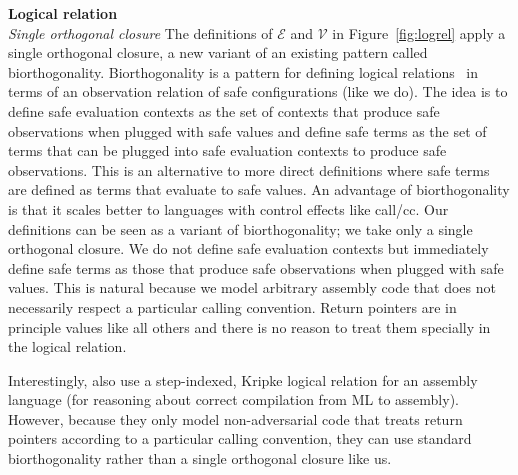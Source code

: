 \documentclass[format=acmsmall, review=true, screen=true]{acmart}
\renewcommand{\figurename}{Figure}
\newcommand{\asmType}{\plaindom{AsmType}}
\newcommand{\plaindom}[1]{\mathrm{#1}}
\newcommand{\intr}[2]{\mathcal{#1}}
\newcommand{\valueintr}[1]{\intr{V}{#1}}
\newcommand{\exprintr}[1]{\intr{E}{#1}}
\newcommand{\stdvr}{\valueintr{\asmType}}
\newcommand{\stder}{\exprintr{\asmType}}
\begin{document}
\noindent\textbf{Logical relation}\\
\emph{Single orthogonal closure} The definitions of $\stder$ and $\stdvr$ in \figurename~\ref{fig:logrel} apply a single orthogonal closure, a new variant of an existing pattern called biorthogonality.
Biorthogonality is a pattern for defining logical relations~\citep{krivine_classical_1994,pitts_operational_1998} in terms of an observation relation of safe configurations (like we do).
The idea is to define safe evaluation contexts as the set of contexts that produce safe observations when plugged with safe values and define safe terms as the set of terms that can be plugged into safe evaluation contexts to produce safe observations.
This is an alternative to more direct definitions where safe terms are defined as terms that evaluate to safe values.
An advantage of biorthogonality is that it scales better to languages with control effects like call/cc.
Our definitions can be seen as a variant of biorthogonality; we take only a single orthogonal closure.
We do not define safe evaluation contexts but immediately define safe terms as those that produce safe observations when plugged with safe values.
This is natural because we model arbitrary assembly code that does not necessarily respect a particular calling convention.
Return pointers are in principle values like all others and there is no reason to treat them specially in the logical relation.

Interestingly, \citet{Hur:2011:KLR:1926385.1926402} also use a step-indexed,
Kripke logical relation for an assembly language (for reasoning about correct
compilation from ML to assembly). However, because they only model non-adversarial
code that treats return pointers according to a particular calling convention,
they can use standard biorthogonality rather than a single orthogonal closure
like us.
\end{document}

